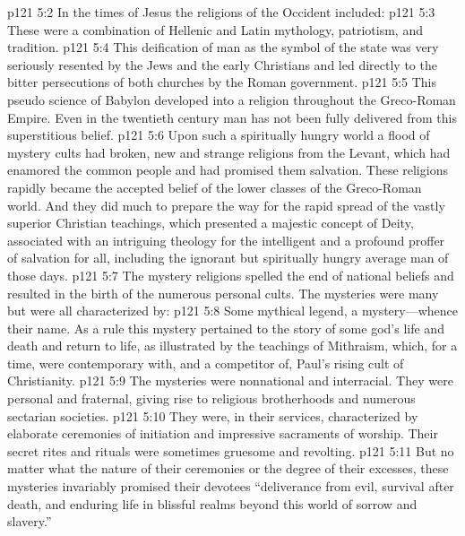 \vs p121 5:2 In the times of Jesus the religions of the Occident included:
\pc \vs p121 5:3 \bibnobreakspace {} These were a combination of Hellenic and Latin mythology, patriotism, and tradition.
\pc \vs p121 5:4 \bibnobreakspace {} This deification of man as the symbol of the state was very seriously resented by the Jews and the early Christians and led directly to the bitter persecutions of both churches by the Roman government.
\pc \vs p121 5:5 \bibnobreakspace {} This pseudo science of Babylon developed into a religion throughout the Greco\hyp{}Roman Empire. Even in the twentieth century man has not been fully delivered from this superstitious belief.
\pc \vs p121 5:6 \bibnobreakspace {} Upon such a spiritually hungry world a flood of mystery cults had broken, new and strange religions from the Levant, which had enamored the common people and had promised them  salvation. These religions rapidly became the accepted belief of the lower classes of the Greco\hyp{}Roman world. And they did much to prepare the way for the rapid spread of the vastly superior Christian teachings, which presented a majestic concept of Deity, associated with an intriguing theology for the intelligent and a profound proffer of salvation for all, including the ignorant but spiritually hungry average man of those days.
\pc \vs p121 5:7 The mystery religions spelled the end of national beliefs and resulted in the birth of the numerous personal cults. The mysteries were many but were all characterized by:
\pc \vs p121 5:8 \bibnobreakspace Some mythical legend, a mystery---whence their name. As a rule this mystery pertained to the story of some god’s life and death and return to life, as illustrated by the teachings of Mithraism, which, for a time, were contemporary with, and a competitor of, Paul’s rising cult of Christianity.
\pc \vs p121 5:9 \bibnobreakspace The mysteries were nonnational and interracial. They were personal and fraternal, giving rise to religious brotherhoods and numerous sectarian societies.
\pc \vs p121 5:10 \bibnobreakspace They were, in their services, characterized by elaborate ceremonies of initiation and impressive sacraments of worship. Their secret rites and rituals were sometimes gruesome and revolting.
\pc \vs p121 5:11 \bibnobreakspace But no matter what the nature of their ceremonies or the degree of their excesses, these mysteries invariably promised their devotees  “deliverance from evil, survival after death, and enduring life in blissful realms beyond this world of sorrow and slavery.”
